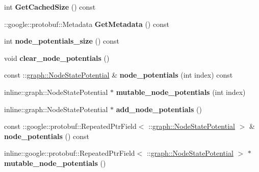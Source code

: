 \begin{DoxyCompactItemize}
\item 
\hypertarget{classgraph_1_1MRFNode_a420b833847841bcbcbbe9baf10d42876}{
int {\bfseries GetCachedSize} () const }
\label{classgraph_1_1MRFNode_a420b833847841bcbcbbe9baf10d42876}

\item 
\hypertarget{classgraph_1_1MRFNode_a5d30d52a630524b309c9cbdddca21f2b}{
::google::protobuf::Metadata {\bfseries GetMetadata} () const }
\label{classgraph_1_1MRFNode_a5d30d52a630524b309c9cbdddca21f2b}

\item 
\hypertarget{classgraph_1_1MRFNode_aed75e0bf0b6fa5b3ae987510ad1dd75e}{
int {\bfseries node\_\-potentials\_\-size} () const }
\label{classgraph_1_1MRFNode_aed75e0bf0b6fa5b3ae987510ad1dd75e}

\item 
\hypertarget{classgraph_1_1MRFNode_a96a52fa9efd3aa762312bfe27ca05927}{
void {\bfseries clear\_\-node\_\-potentials} ()}
\label{classgraph_1_1MRFNode_a96a52fa9efd3aa762312bfe27ca05927}

\item 
\hypertarget{classgraph_1_1MRFNode_ac1f7d6be6271459b95b37029f8cd31d5}{
const ::\hyperlink{classgraph_1_1NodeStatePotential}{graph::NodeStatePotential} \& {\bfseries node\_\-potentials} (int index) const }
\label{classgraph_1_1MRFNode_ac1f7d6be6271459b95b37029f8cd31d5}

\item 
\hypertarget{classgraph_1_1MRFNode_a9edb6b65ffa1013096b7c47e0efaf0fe}{
inline::graph::NodeStatePotential $\ast$ {\bfseries mutable\_\-node\_\-potentials} (int index)}
\label{classgraph_1_1MRFNode_a9edb6b65ffa1013096b7c47e0efaf0fe}

\item 
\hypertarget{classgraph_1_1MRFNode_ae1315322d7c8e26b8a38cc7ba1bb8d0e}{
inline::graph::NodeStatePotential $\ast$ {\bfseries add\_\-node\_\-potentials} ()}
\label{classgraph_1_1MRFNode_ae1315322d7c8e26b8a38cc7ba1bb8d0e}

\item 
\hypertarget{classgraph_1_1MRFNode_abbecf76da2911c8aa312b7096175c216}{
const ::google::protobuf::RepeatedPtrField$<$ ::\hyperlink{classgraph_1_1NodeStatePotential}{graph::NodeStatePotential} $>$ \& {\bfseries node\_\-potentials} () const }
\label{classgraph_1_1MRFNode_abbecf76da2911c8aa312b7096175c216}

\item 
\hypertarget{classgraph_1_1MRFNode_acb144411ba170fa36398fd55c07b99ca}{
inline::google::protobuf::RepeatedPtrField$<$ ::\hyperlink{classgraph_1_1NodeStatePotential}{graph::NodeStatePotential} $>$ $\ast$ {\bfseries mutable\_\-node\_\-potentials} ()}
\label{classgraph_1_1MRFNode_acb144411ba170fa36398fd55c07b99ca}


\end{DoxyCompactItemize}
